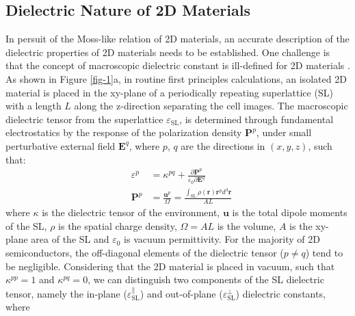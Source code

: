 \documentclass[journal=ancac3,manuscript=article,email=true,hyperref=true,keywords=false]{achemso}
\begin{document}
\subsection{Dielectric Nature of 2D Materials}
\label{sec:2d}

In persuit of the Moss-like relation of 2D materials, an accurate
description of the dielectric properties of 2D materials needs to be
established. One challenge is that the concept of macroscopic
dielectric constant is ill-defined for 2D materials
\cite{Cudazzo_2010_screen2D,Cudazzo_2011_screening_2D,Nazarov_2015_2D_3D}. As
shown in Figure \ref{fig-1}a, in routine first principles
calculations, an isolated 2D material is placed in the xy-plane of a
periodically repeating superlattice (SL) with a length $L$ along the
z-direction separating the cell images. The macroscopic dielectric
tensor from the superlattice $\varepsilon_{\mathrm{SL}}$, is
determined through fundamental electrostatics by the response of the
polarization density $\boldsymbol{P}^{p}$, under small
perturbative external field $\boldsymbol{E}^{q}$, where $p$, $q$ are
the directions in $(x, y, z)$, such that:
\begin{subequations}
  \begin{eqnarray}
      \label{eq:def-eps-1}
    &\varepsilon^{p} &= \kappa^{pq} +
                                 {\displaystyle \frac{\partial \boldsymbol{P}^{p}}
                                 {\varepsilon_{0} \partial \boldsymbol{E}^{q}}} \\
          \label{eq:def-eps-2}
    &\boldsymbol{P}^{p} &=  {\displaystyle \frac{\boldsymbol{u}^{p}}{\Omega}}
                          = {\displaystyle \frac{{\displaystyle
          \int_{\mathrm{SL}} \rho(\boldsymbol{r}) \boldsymbol{r}^{p} d^{3}\boldsymbol{r}}}
                          {AL}}
  \end{eqnarray}
\end{subequations}
where $\kappa$ is the dielectric tensor of the environment,
$\boldsymbol{u}$ is the total dipole moments of the SL, $\rho$ is the
spatial charge density, $\Omega=AL$ is the volume, $A$ is the xy-plane
area of the SL and $\varepsilon_{0}$ is vacuum permittivity. For the
majority of 2D semiconductors, the off-diagonal elements of the
dielectric tensor ($p \neq q$) tend to be negligible.  Considering
that the 2D material is placed in vacuum, such that $\kappa^{pp} = 1$
and $\kappa^{pq} = 0$, we can distinguish two components of the SL
dielectric tensor, namely the in-plane
($\varepsilon_{\mathrm{SL}}^{\parallel}$) and out-of-plane
($\varepsilon_{\mathrm{SL}}^{\perp}$) dielectric constants, where
\end{document}
